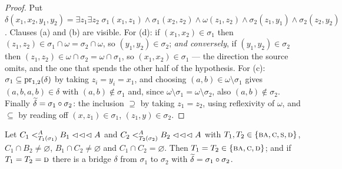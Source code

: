 \begin{proof}
Put
$\delta(x_{1},x_{2},y_{1},y_{2})=\exists z_{1}\exists z_{2}\;
\sigma_{1}(x_{1},z_{1})\wedge\sigma_{1}(x_{2},z_{2})\wedge\omega(z_{1},z_{2})
\wedge\sigma_{2}(z_{1},y_{1})\wedge\sigma_{2}(z_{2},y_{2})$.
Clauses (a) and (b) are visible. For (d): if $(x_{1},x_{2})\in\sigma_{1}$ then
$(z_{1},z_{2})\in\sigma_{1}\cap\omega=\sigma_{2}\cap\omega$, so
$(y_{1},y_{2})\in\sigma_{2}$; \emph{and conversely}, if
$(y_{1},y_{2})\in\sigma_{2}$ then $(z_{1},z_{2})\in\omega\cap\sigma_{2}=
\omega\cap\sigma_{1}$, so $(x_{1},x_{2})\in\sigma_{1}$ --- the direction the
source omits, and the one that spends the other half of the hypothesis. For
(c): $\sigma_{1}\subseteq\proj_{1,2}(\delta)$ by taking $z_{i}=y_{i}=x_{1}$,
and choosing $(a,b)\in\omega\setminus\sigma_{1}$ gives $(a,b,a,b)\in\delta$
with $(a,b)\notin\sigma_{1}$ and, since
$\omega\setminus\sigma_{1}=\omega\setminus\sigma_{2}$, also
$(a,b)\notin\sigma_{2}$. Finally $\bcol\delta=\sigma_{1}\circ\sigma_{2}$: the
inclusion $\supseteq$ by taking $z_{1}=z_{2}$, using reflexivity of $\omega$,
and $\subseteq$ by reading off $(x,z_{1})\in\sigma_{1}$, $(z_{1},y)\in\sigma_{2}$.
\end{proof}

\begin{longlemma}\label{lem:two-stable}
Let $C_{1}\subt[A]{T_{1}(\sigma_{1})}B_{1}\lll A$ and
$C_{2}\subt[A]{T_{2}(\sigma_{2})}B_{2}\lll A$ with
$T_{1},T_{2}\in\{\TBA,\TC,\TS,\TD\}$, $C_{1}\cap B_{2}\neq\varnothing$,
$B_{1}\cap C_{2}\neq\varnothing$ and $C_{1}\cap C_{2}=\varnothing$. Then
$T_{1}=T_{2}\in\{\TBA,\TC,\TD\}$; and if $T_{1}=T_{2}=\TD$ there is a bridge
$\delta$ from $\sigma_{1}$ to $\sigma_{2}$ with
$\bcol\delta=\sigma_{1}\circ\sigma_{2}$.
\end{longlemma}

